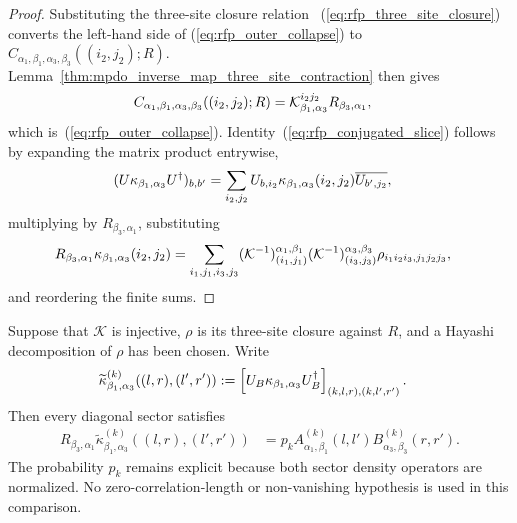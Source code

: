 \begin{proof}
    \leanok
    Substituting the three-site closure relation~
    (\ref{eq:rfp_three_site_closure}) converts the left-hand side
    of (\ref{eq:rfp_outer_collapse}) to
    $C_{\alpha_1,\beta_1,\alpha_3,\beta_3}((i_2,j_2);R)$.
    Lemma~\ref{thm:mpdo_inverse_map_three_site_contraction} then gives
    \begin{align}
        C_{\alpha_1,\beta_1,\alpha_3,\beta_3}((i_2,j_2);R)
         & =\mathcal K^{i_2j_2}_{\beta_1,\alpha_3}
        R_{\beta_3,\alpha_1},
        \notag
    \end{align}
    which is~(\ref{eq:rfp_outer_collapse}). Identity~(\ref{eq:rfp_conjugated_slice}) follows by
    expanding the matrix product entrywise,
    \begin{align}
        (U\kappa_{\beta_1,\alpha_3}U^\dagger)_{b,b'}
         & =\sum_{i_2,j_2}
        U_{b,i_2} \kappa_{\beta_1,\alpha_3}(i_2,j_2)
        \overline{U_{b',j_2}},
        \notag
    \end{align}
    multiplying by $R_{\beta_3,\alpha_1}$, substituting
    \begin{align}
        R_{\beta_3,\alpha_1}
        \kappa_{\beta_1,\alpha_3}(i_2,j_2)
         & =\sum_{i_1,j_1,i_3,j_3}
        (\mathcal K^{-1})^{\alpha_1,\beta_1}_{(i_1,j_1)}
        (\mathcal K^{-1})^{\alpha_3,\beta_3}_{(i_3,j_3)}
        \rho_{i_1i_2i_3,j_1j_2j_3},
        \notag
    \end{align}
    and reordering the finite sums.
\end{proof}

\begin{lemma}
    \label{thm:mpdo_inverse_map_hayashi_sector_comparison}
    \leanok
    Suppose that $\mathcal K$ is injective, $\rho$ is its three-site closure
    against $R$, and a Hayashi decomposition of $\rho$ has been chosen. Write
    \begin{align}
        \widetilde\kappa^{(k)}_{\beta_1,\alpha_3}
        ((l,r),(l',r'))
         & :=
        \left[U_B\kappa_{\beta_1,\alpha_3}U_B^\dagger\right]_{(k,l,r),(k,l',r')}.
        \notag
    \end{align}
    Then every diagonal sector satisfies
    \begin{align}
        R_{\beta_3,\alpha_1}
        \widetilde\kappa^{(k)}_{\beta_1,\alpha_3}
        ((l,r),(l',r'))
         & =p_k A^{(k)}_{\alpha_1,\beta_1}(l,l')
        B^{(k)}_{\alpha_3,\beta_3}(r,r').
        \label{eq:rfp_sector_comparison}
    \end{align}
    The probability $p_k$ remains explicit because both sector density
    operators are normalized. No zero-correlation-length or non-vanishing
    hypothesis is used in this comparison.
\end{lemma}

